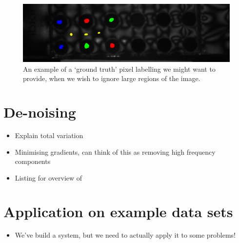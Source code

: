 \documentclass[12pt,twoside,notitlepage]{report}
\begin{document}
        \begin{figure}
            \centering
            \includegraphics[scale=0.2]{example_pixel_label_siri}
            \caption{An example of a `ground truth' pixel labelling we might want to provide, when we wish to ignore large regions of 
            the image.} 
            \label{fig:non_perfect_labelling}
        \end{figure}






    \section{De-noising} \label{sec:de-noising}
        \begin{itemize}
            \item Explain total variation
            \item Minimising gradients, can think of this as removing high frequency components
            \item Listing for overview of 
        \end{itemize}




    \section{Application on example data sets}
        \begin{itemize}
            \item We've build a system, but we need to actually apply it to some problems!
        \end{itemize} 
\end{document}
